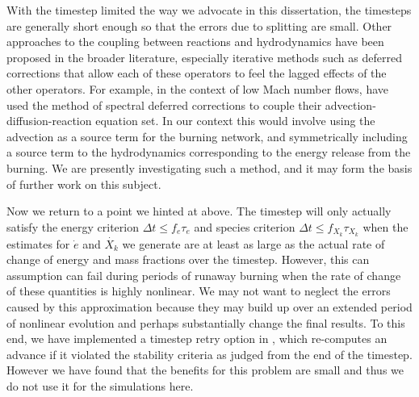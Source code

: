 \documentclass[12pt]{article}
\begin{document}
With the timestep limited the way we advocate in this dissertation, 
the timesteps are generally short enough so that the errors 
due to splitting are small. Other approaches to the coupling 
between reactions and hydrodynamics have been proposed in the 
broader literature, especially iterative methods such as 
deferred corrections that allow each of these operators to 
feel the lagged effects of the other operators. For example,
in the context of low Mach number flows, \cite{nonaka:2012} have
used the method of spectral deferred corrections \citep{SDC} to
couple their advection-diffusion-reaction equation set. In our
context this would involve using the advection as a source term
for the burning network, and symmetrically including a source
term to the hydrodynamics corresponding to the energy release
from the burning. We are presently investigating such a method,
and it may form the basis of further work on this subject.

Now we return to a point we hinted at above. The timestep
will only actually satisfy the energy criterion
$\Delta t \leq f_e \tau_e$ and species criterion
$\Delta t \leq f_{X_k} \tau_{X_k}$ when the estimates for
$\dot{e}$ and $\dot{X_k}$ we generate are at least as large
as the actual rate of change of energy and mass fractions
over the timestep. However, this can assumption can fail
during periods of runaway burning when the rate of change
of these quantities is highly nonlinear. We may not want
to neglect the errors caused by this approximation
because they may build up over an extended period of nonlinear
evolution and perhaps substantially change the final results.
To this end, we have implemented a timestep retry option in
\castro, which re-computes an advance if it violated the
stability criteria as judged from the end of the timestep.
However we have found that the benefits for this problem are
small and thus we do not use it for the simulations here.
\end{document}
